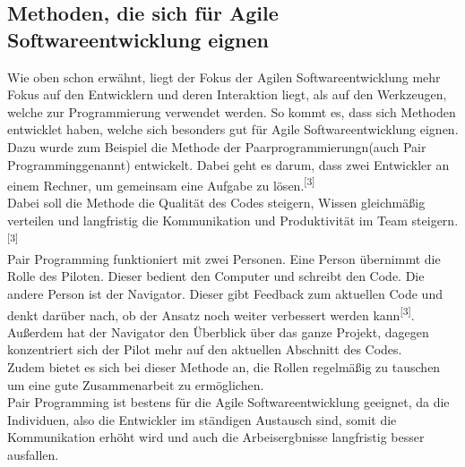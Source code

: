 \documentclass[a4paper, 10pt]{scrartcl}
\begin{document}
\subsection{Methoden, die sich für Agile Softwareentwicklung eignen}
Wie oben schon erwähnt, liegt der Fokus der Agilen Softwareentwicklung mehr Fokus auf den Entwicklern und deren Interaktion liegt, als auf den Werkzeugen, welche zur Programmierung verwendet werden. So kommt es, dass sich Methoden entwicklet haben, welche sich besonders gut für Agile Softwareentwicklung eignen.\\
Dazu wurde zum Beispiel die Methode der Paarprogrammierungn(auch \glqq Pair Programming\grqq genannt) entwickelt. Dabei geht es darum, dass \glqq zwei Entwickler an einem Rechner, um gemeinsam eine Aufgabe zu lösen.\grqq \textsuperscript{[3]}\\ Dabei soll die Methode \glqq die Qualität des Codes steigern, Wissen gleichmäßig verteilen und langfristig die Kommunikation und Produktivität im Team steigern.\grqq \textsuperscript{[3]}\\ Pair Programming funktioniert mit zwei Personen. Eine Person übernimmt die Rolle des Piloten. Dieser bedient den Computer und schreibt den Code. Die andere Person ist der Navigator. Dieser \glqq gibt Feedback zum aktuellen Code und denkt darüber nach, ob der Ansatz noch weiter verbessert werden kann\grqq \textsuperscript{[3]}. Außerdem hat der Navigator den Überblick über das ganze Projekt, dagegen konzentriert sich der Pilot mehr auf den aktuellen Abschnitt des Codes.\\Zudem bietet es sich bei dieser Methode an, die Rollen regelmäßig zu tauschen um eine gute Zusammenarbeit zu ermöglichen.\\Pair Programming ist bestens für die Agile Softwareentwicklung geeignet, da die Individuen, also die Entwickler im ständigen Austausch sind, somit die Kommunikation erhöht wird und auch die Arbeisergbnisse langfristig besser ausfallen.\ 
\end{document}
